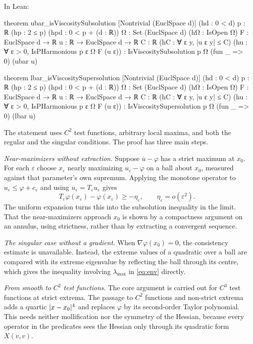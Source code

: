 \documentclass[11pt,reqno]{amsart}
\newcommand{\eps}{\varepsilon}
\newcommand{\Op}{T_{\eps}}                       %
\DeclarePairedDelimiter{\abs}{\lvert}{\rvert}
\theoremstyle{plain}
\theoremstyle{definition}
\theoremstyle{remark}
\begin{document}
\begin{samepage}
\noindent In Lean:
\begin{lean}
theorem ubar_isViscositySubsolution [Nontrivial (EuclSpace d)] (hd : 0 < d)
    {p : ℝ} (hp : 2 ≤ p) (hpd : 0 < p + (d : ℝ))
    {Ω : Set (EuclSpace d)} (hΩ : IsOpen Ω) {F : EuclSpace d → ℝ}
    {u : ℝ → EuclSpace d → ℝ} {C : ℝ} (hC : ∀ ε y, |u ε y| ≤ C)
    (hu : ∀ ε > 0, IsPHarmonious p ε Ω F (u ε)) :
    IsViscositySubsolution p Ω (fun _ => 0) (ubar u)

theorem lbar_isViscositySupersolution [Nontrivial (EuclSpace d)] (hd : 0 < d)
    {p : ℝ} (hp : 2 ≤ p) (hpd : 0 < p + (d : ℝ))
    {Ω : Set (EuclSpace d)} (hΩ : IsOpen Ω) {F : EuclSpace d → ℝ}
    {u : ℝ → EuclSpace d → ℝ} {C : ℝ} (hC : ∀ ε y, |u ε y| ≤ C)
    (hu : ∀ ε > 0, IsPHarmonious p ε Ω F (u ε)) :
    IsViscositySupersolution p Ω (fun _ => 0) (lbar u)
\end{lean}
\end{samepage}

The statement uses $C^2$ test functions, arbitrary local maxima, and both the
regular and the singular conditions. The proof has three main steps.

\emph{Near-maximizers without extraction.} Suppose $\overline u - \varphi$
has a strict maximum at $x_0$. For each $\eps$ choose $x_\eps$ nearly
maximizing $u_\eps - \varphi$ on a ball about $x_0$, measured against that
parameter's own supremum. Applying the monotone operator to
$u_\eps \le \varphi + c_\eps$ and using $u_\eps = \Op u_\eps$ gives
\[
  \Op\varphi(x_\eps)-\varphi(x_\eps)\ge-\eta_\eps,
  \qquad \eta_\eps=o(\eps^2).
\]
The uniform expansion turns this into the subsolution
inequality in the limit. That the near-maximizers approach $x_0$ is shown by
a compactness argument on an annulus, using strictness, rather than by
extracting a convergent sequence.

\emph{The singular case without a gradient.} When $\nabla\varphi(x_0) = 0$,
the consistency estimate is unavailable. Instead, the extreme values of a
quadratic over a ball are compared with its extreme eigenvalue by reflecting
the ball through its centre, which gives the inequality involving
$\lambda_{\max}$ in \eqref{eq:env} directly.

\emph{From smooth to $C^2$ test functions.} The core argument is carried out
for $C^3$ test functions at strict extrema. The passage to $C^2$ functions and
non-strict extrema adds a quartic $\abs{x - x_0}^4$ and replaces $\varphi$ by
its second-order Taylor polynomial. This needs neither mollification nor the
symmetry of the Hessian, because every operator in the predicates sees the
Hessian only through its quadratic form $X(v,v)$.
\end{document}

